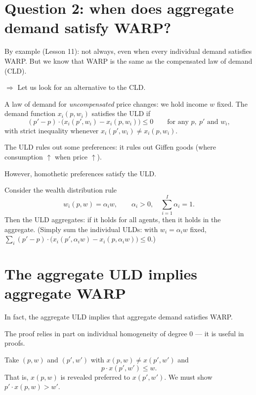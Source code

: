 \documentclass[11pt]{article}
\begin{document}


\section{Question 2: when does aggregate demand satisfy WARP?}

 By example (Lesson 11): not always, even when every
individual demand satisfies WARP. But we know that WARP is the same as the
compensated law of demand (CLD).

$\Rightarrow$ Let us look for an alternative to the CLD.

A law of demand for \emph{uncompensated} price changes: we hold income $w$ fixed.
The demand function $x_i(p,w_i)$ satisfies the ULD if
\[ (p'-p)\cdot\bigl(x_i(p',w_i)-x_i(p,w_i)\bigr)\le 0
   \qquad\text{for any } p,\ p' \text{ and } w_i, \]
with strict inequality whenever $x_i(p',w_i)\ne x_i(p,w_i)$.

The ULD rules out some preferences: it rules out Giffen goods (where consumption
$\uparrow$ when price $\uparrow$).

However, homothetic preferences satisfy the ULD.

Consider the wealth distribution rule
\[ w_i(p,w)=\alpha_i w,\qquad \alpha_i>0,\quad \sum_{i=1}^{I}\alpha_i=1. \]
Then the ULD aggregates: if it holds for all agents, then it holds in the
aggregate. (Simply sum the individual ULDs: with $w_i=\alpha_i w$ fixed,
$\sum_i (p'-p)\cdot\bigl(x_i(p',\alpha_i w)-x_i(p,\alpha_i w)\bigr)\le 0$.)


\section{The aggregate ULD implies aggregate WARP}

In fact, the aggregate ULD implies that aggregate demand satisfies WARP.

 The proof relies in part on individual homogeneity of degree 0 ---
it is useful in proofs.

Take $(p,w)$ and $(p',w')$ with $x(p,w)\ne x(p',w')$ and
\[ p\cdot x(p',w')\le w. \]
That is, $x(p,w)$ is revealed preferred to $x(p',w')$. We must show
$p'\cdot x(p,w)>w'$.
\end{document}
